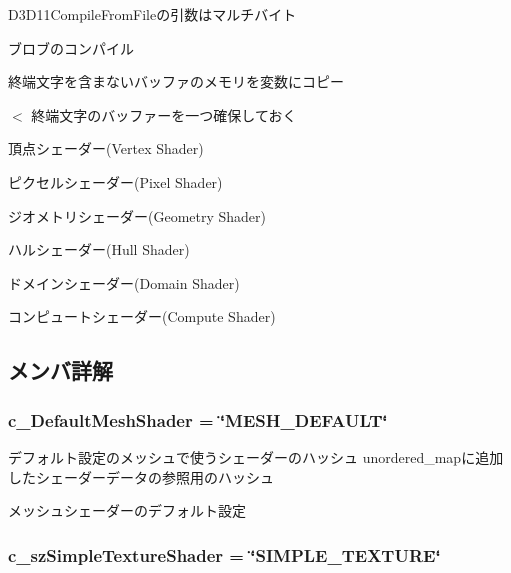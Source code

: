D3\+D11\+Compile\+From\+Fileの引数はマルチバイト

ブロブのコンパイル

終端文字を含まないバッファのメモリを変数にコピー

$<$ 終端文字のバッファーを一つ確保しておく

頂点シェーダー(\+Vertex Shader)

ピクセルシェーダー(\+Pixel Shader)

ジオメトリシェーダー(\+Geometry Shader)

ハルシェーダー(\+Hull Shader)

ドメインシェーダー(\+Domain Shader)

コンピュートシェーダー(\+Compute Shader) 

\subsection{メンバ詳解}
\subsubsection[{\texorpdfstring{c\+\_\+\+Default\+Mesh\+Shader}{c_DefaultMeshShader}}]{\setlength{\rightskip}{0pt plus 5cm}c\+\_\+\+Default\+Mesh\+Shader = \char`\"{}M\+E\+S\+H\+\_\+\+D\+E\+F\+A\+U\+LT\char`\"{}\hspace{0.3cm}{\ttfamily [static]}}\hypertarget{class_d3_d11_1_1_graphic_1_1_shader_manager_ad1607cbc05176bb70e3699dd651b4674}{}\label{class_d3_d11_1_1_graphic_1_1_shader_manager_ad1607cbc05176bb70e3699dd651b4674}


デフォルト設定のメッシュで使うシェーダーのハッシュ  unordered\+\_\+mapに追加したシェーダーデータの参照用のハッシュ 

メッシュシェーダーのデフォルト設定 
\subsubsection[{\texorpdfstring{c\+\_\+sz\+Simple\+Texture\+Shader}{c_szSimpleTextureShader}}]{\setlength{\rightskip}{0pt plus 5cm}c\+\_\+sz\+Simple\+Texture\+Shader = \char`\"{}S\+I\+M\+P\+L\+E\+\_\+\+T\+E\+X\+T\+U\+RE\char`\"{}\hspace{0.3cm}{\ttfamily [static]}}\hypertarget{class_d3_d11_1_1_graphic_1_1_shader_manager_a40c965cdd249ce2492b6f554987c9c71}{}\label{class_d3_d11_1_1_graphic_1_1_shader_manager_a40c965cdd249ce2492b6f554987c9c71}


